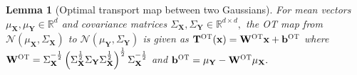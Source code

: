 \documentclass[10pt]{article} %
\newtheorem{lemma}[theorem]{Lemma}
\begin{document}
\begin{lemma}[Optimal transport map between two Gaussians]\label{lemma:gaussianOT}
    For mean vectors $\mu_{\mathbf{X}}, \mu_{\mathbf{Y}} \in \mathbb{R}^{d}$ and covariance matrices $\Sigma_{\mathbf{X}}, \Sigma_{\mathbf{Y}} \in \mathbb{R}^{d \times d},$
    the OT map from $\mathcal{N}(\mu_{\mathbf{X}}, \Sigma_{\mathbf{X}})$ to $\mathcal{N}(\mu_{\mathbf{Y}}, \Sigma_{\mathbf{Y}})$ is given as
    $ \mathbf{T}^{\textsc{OT}} (\mathbf{x}) = \mathbf{W}^{\textsc{OT}} \mathbf{x} + \mathbf{b}^{\textsc{OT}} $
    where
    $ \mathbf{W}^{\textsc{OT}} = \Sigma_{\mathbf{X}}^{-\frac{1}{2}} \left( \Sigma_{\mathbf{X}}^{\frac{1}{2}} \Sigma_{\mathbf{Y}} \Sigma_{\mathbf{X}}^{\frac{1}{2}} \right)^{ \frac{1}{2} } \Sigma_{\mathbf{X}}^{-\frac{1}{2}} $ and $ \mathbf{b}^{\textsc{OT}} = \mu_{\mathbf{Y}} - \mathbf{W}^{\textsc{OT}} \mu_{\mathbf{X}}. $
\end{lemma}
\end{document}
